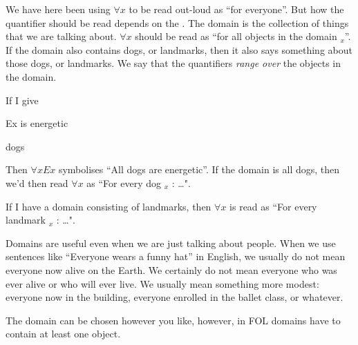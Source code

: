 We have here been using $\forall x$ to be read out-loud as ``for everyone''. 
But how the quantifier should be read depends on the . The domain is the collection of things that we are talking about. $\forall x$ should be read as ``for all objects in the domain $_x$''. If the domain also contains dogs, or landmarks, then it also says something about those dogs, or landmarks. We say that the quantifiers \emph{range over} the objects in the domain. 

If I give 
\begin{ekey}
\item[Ex] is energetic
\item[\text{domain}] dogs
\end{ekey}
Then $\forall x Ex$ symbolises ``All dogs are energetic''. If the domain is all dogs, then we'd then read $\forall x$ as ``For every dog $_x$ : \ldots". 

If I have a domain consisting of landmarks, then $\forall x$ is read as ``For every landmark $_x$ : \ldots". 

Domains are useful even when we are just talking about people. 
When we use sentences like ``Everyone wears a funny hat'' in English, we usually do not mean everyone now alive on the Earth. We certainly do not mean everyone who was ever alive or who will ever live. We usually mean something more modest: everyone now in the building, everyone enrolled in the ballet class, or whatever.



The domain can be chosen however you like, however, in FOL domains have to contain at least one object. 

